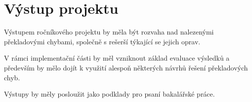 \documentclass[12pt,a4paper]{article}
\begin{document}
	\section{Výstup projektu}
	Výstupem ročníkového projektu by měla být rozvaha nad nalezenými překladovými chybami, společně s rešerší týkající se jejich oprav.
	
	V rámci implementační části by měl vzniknout základ evaluace výsledků a především by mělo dojít k využití alespoň některých návrhů řešení překladových chyb.
	
	Výstupy by měly posloužit jako podklady pro psaní bakalářské práce.
\end{document}
